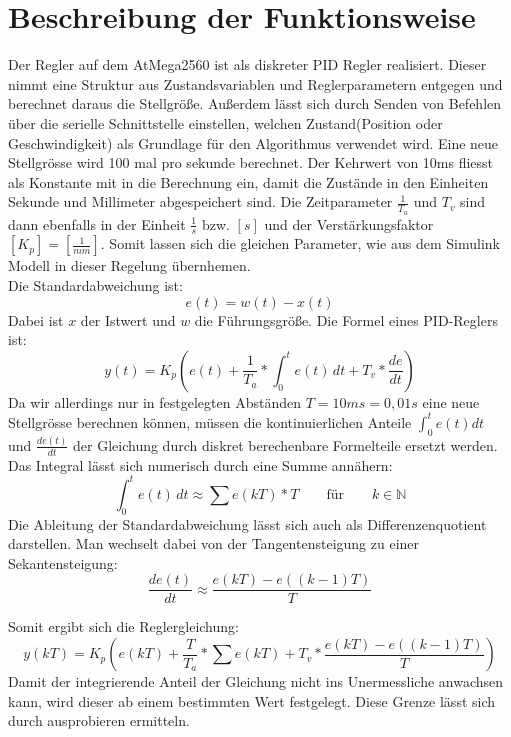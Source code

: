 \documentclass[a4paper]{report}
\begin{document}
\section{Beschreibung der Funktionsweise}
Der Regler auf dem AtMega2560 ist als diskreter PID Regler realisiert. Dieser nimmt eine Struktur aus Zustandsvariablen und Reglerparametern entgegen und berechnet daraus die Stellgröße. Außerdem lässt sich durch Senden von Befehlen \"uber die serielle Schnittstelle einstellen, welchen Zustand(Position oder Geschwindigkeit) als Grundlage f\"ur den Algorithmus verwendet wird.
Eine neue Stellgr\"osse wird 100 mal pro sekunde berechnet. Der Kehrwert von 10ms fliesst als Konstante mit in die Berechnung ein, damit die Zust\"ande in den Einheiten Sekunde und Millimeter abgespeichert sind. Die Zeitparameter $\frac{1}{T_a}$ und $T_v$ sind dann ebenfalls in der Einheit $\frac{1}{s}$ bzw. $[s]$ und der Verst\"arkungsfaktor $[K_p]=[\frac{1}{mm}]$. Somit lassen sich die gleichen Parameter, wie aus dem Simulink Modell in dieser Regelung \"ubernhemen. \\
Die Standardabweichung ist: \[e(t)=w(t)-x(t)\] Dabei ist $x$ der Istwert und $w$ die F\"uhrungsgr\"o{\ss}e. Die Formel eines PID-Reglers ist: \[y(t)=K_p\left(e(t)+\frac{1}{T_a}*\int_0^t e(t) \,dt +T_v*\frac{de}{dt}\right)\]
Da wir allerdings nur in festgelegten Abst\"anden $T=10ms=0,01s$ eine neue Stellgr\"osse berechnen k\"onnen, m\"ussen die kontinuierlichen Anteile $\int_0^t e(t) dt$ und $\frac{de(t)}{dt}$ der Gleichung durch diskret berechenbare Formelteile ersetzt werden. Das Integral l\"asst sich numerisch durch eine Summe ann\"ahern:
\[\int_0^t e(t) \,dt \approx \sum e(kT)*T \qquad\mbox{f\"ur} \qquad k \in \mathbb{N}\]
Die Ableitung der Standardabweichung  l\"asst sich auch als Differenzenquotient darstellen. Man wechselt dabei von der Tangentensteigung zu einer Sekantensteigung:
\[\frac{de(t)}{dt} \approx \frac{e(kT)-e((k-1)T)}{T} \]

Somit ergibt sich die Reglergleichung:
\[ y(kT)=K_p\left(e(kT)+\frac{T}{T_a}*\sum e(kT)  +T_v*\frac{e(kT)-e((k-1)T)}{T}\right)\]
Damit der integrierende Anteil der Gleichung nicht ins Unermessliche anwachsen kann, wird dieser ab einem bestimmten Wert festgelegt. Diese Grenze l\"asst sich durch ausprobieren ermitteln.
\end{document}
